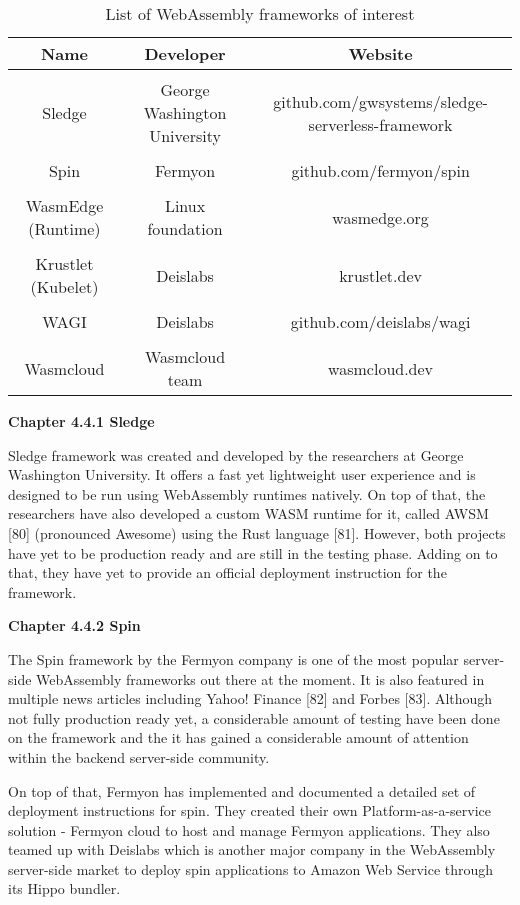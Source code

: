 \bigskip
\begin{table}[h!]
\centering
\begin{tabular}{||c c c||} 
\hline
Name & Developer & Website \\ [1ex] 
\hline\hline
 & & \\
Sledge & George Washington University & github.com/gwsystems/sledge-serverless-framework \\ 
 & & \\
Spin & Fermyon & github.com/fermyon/spin \\
 & & \\
WasmEdge (Runtime) & Linux foundation & wasmedge.org \\
 & & \\
Krustlet (Kubelet) & Deislabs & krustlet.dev \\
 & & \\
WAGI & Deislabs & github.com/deislabs/wagi \\
 & & \\
Wasmcloud & Wasmcloud team & wasmcloud.dev \\ [1ex]
\hline
\end{tabular}
\caption{List of WebAssembly frameworks of interest}
\label{table:webassembly_frameworks}
\end{table}

\bigskip
\textbf{{\normalsize Chapter 4.4.1 Sledge}}

Sledge framework was created and developed by the researchers at George Washington University. It offers a fast yet lightweight user experience and is designed to be run using WebAssembly runtimes natively. On top of that, the researchers have also developed a custom WASM runtime for it, called AWSM [80] (pronounced Awesome) using the Rust language [81]. However, both projects have yet to be production ready and are still in the testing phase. Adding on to that, they have yet to provide an official deployment instruction for the framework.

\bigskip
\textbf{{\normalsize Chapter 4.4.2 Spin}}

The Spin framework by the Fermyon company is one of the most popular server-side WebAssembly frameworks out there at the moment. It is also featured in multiple news articles including Yahoo! Finance [82] and Forbes [83]. Although not fully production ready yet, a considerable amount of testing have been done on the framework and the it has gained a considerable amount of attention within the backend server-side community.

On top of that, Fermyon has implemented and documented a detailed set of deployment instructions for spin. They created their own Platform-as-a-service solution - Fermyon cloud to host and manage Fermyon applications. They also teamed up with Deislabs which is another major company in the WebAssembly server-side market to deploy spin applications to Amazon Web Service through its Hippo bundler.

